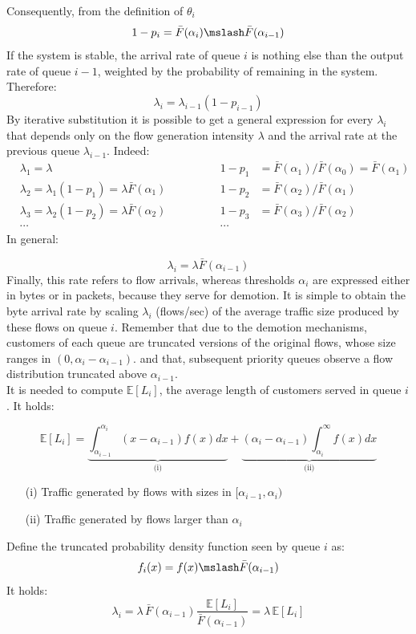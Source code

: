 Consequently, from the definition of $\theta_i$
\[ 	
1-p_i = \bar{F}(\alpha_{i}) \mslash \bar{F}(\alpha_{i-1}) 
\]
If the system is stable, the arrival rate of queue $i$ is nothing else than the output rate
of queue $i-1$, weighted by the probability of remaining in the system. 
Therefore: 
\[
\lambda_i = \lambda_{i-1} (1-p_{i-1})
\]
By iterative substitution it is possible to get a general expression for every $\lambda_i$ that depends only on the flow generation intensity $\lambda$ and the arrival rate at the previous queue $\lambda_{i-1}$. Indeed:
\begin{align*}
&\lambda_1 = \lambda \qquad \qquad & 1-p_1 &= \bar{F}(\alpha_1) / \bar{F}(\alpha_0) = \bar{F}(\alpha_1) \\
&\lambda_2 =  \lambda_1 (1-p_1) = \lambda \bar{F}(\alpha_1)  \qquad \qquad & 1-p_2 &= \bar{F}(\alpha_2) / \bar{F}(\alpha_1) \\
&\lambda_3 =  \lambda_2 (1-p_2) = \lambda \bar{F}(\alpha_2)  \qquad \qquad & 1-p_3 &= \bar{F}(\alpha_3) / \bar{F}(\alpha_2) \\
& \cdots \qquad \qquad & \cdots &
\end{align*}
In general:

\[
	\lambda_{i} = \lambda \bar{F}(\alpha_{i-1})
\]
Finally, this rate refers to flow arrivals, whereas thresholds $\alpha_i$ are expressed either in bytes or in packets, because they serve for demotion. It is simple to obtain the byte arrival rate by scaling $\lambda_i$ (flows/sec) of the average traffic size produced by these flows on queue $i$. Remember that due to the demotion mechanisms, customers of each queue are truncated versions of the original flows, whose size ranges in $(0, \alpha_{i}-\alpha_{i-1})$. and that, subsequent priority queues observe a flow distribution truncated above $\alpha_{i-1}$. \\
It is needed to compute $\mathbb{E}[L_i]$, the average length of customers served in queue $i$. It holds:

\begin{equation}
\label{load-on-pqi}
\mathbb{E}[L_i]=
\underbrace{\int_{\alpha_{i-1}}^{\alpha_i}(x-\alpha_{i-1})f(x)dx}_{\text{(i)}} +
\underbrace{(\alpha_{i}-\alpha_{i-1})\int_{\alpha_i}^{\infty}f(x)dx}_{\text{(ii)}}
\end{equation}

\begin{itemize}
	\item[(i)]Traffic generated by flows with sizes in $[\alpha_{i-1},\alpha_{i})$
	\item[(ii)] Traffic generated by flows larger than $\alpha_{i}$
\end{itemize}
Define the truncated probability density function seen by queue $i$ as:
\[
f_i(x) = f(x) \mslash \bar{F}(\alpha_{i-1})
\]
It holds:
\begin{equation}
\lambda_i =   \lambda \, \bar{F}(\alpha_{i-1}) \frac{\mathbb{E}[L_i]}{\bar{F}(\alpha_{i-1})} = \lambda \, \mathbb{E}[L_i]
\end{equation}

